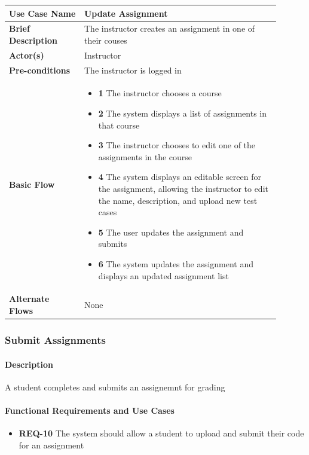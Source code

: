\documentclass{article}
\begin{document}
\begin{tabular}{| p{0.25\linewidth} | p{0.65\linewidth} |}
  \hline
  \textbf{Use Case Name} & Update Assignment \\
  \hline
  \textbf{Brief Description} & The instructor creates an assignment in one of their couses \\
  \hline
  \textbf{Actor(s)} & Instructor \\
  \hline
  \textbf{Pre-conditions} & The instructor is logged in\\
  \hline
  \textbf{Basic Flow} & \begin{itemize}
    \item[] \textbf{1} The instructor chooses a course
    \item[] \textbf{2} The system displays a list of assignments in that course
    \item[] \textbf{3} The instructor chooses to edit one of the assignments in the course
    \item[] \textbf{4} The system displays an editable screen for the assignment, allowing the instructor to edit the name, description, and upload new test cases
    \item[] \textbf{5} The user updates the assignment and submits
    \item[] \textbf{6} The system updates the assignment and displays an updated assignment list
  \end{itemize}\\
  \hline
  \textbf{Alternate Flows} & None \\
  \hline
\end{tabular}

\subsubsection{Submit Assignments}

\paragraph{Description} A student completes and submits an assignemnt for grading

\paragraph{Functional Requirements and Use Cases}

\begin{itemize}
  \item \textbf{REQ-10} The system should allow a student to upload and submit their code for an assignment
\end{itemize}
\end{document}
